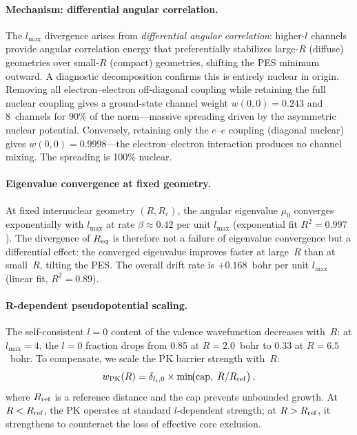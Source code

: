 \documentclass[aps,pra,twocolumn,superscriptaddress,longbibliography,floatfix]{revtex4-2}
\begin{document}
\paragraph{Mechanism: differential angular correlation.}
The $l_{\max}$ divergence arises from \emph{differential angular
correlation}: higher-$l$ channels provide angular correlation energy
that preferentially stabilizes large-$R$ (diffuse) geometries over
small-$R$ (compact) geometries, shifting the PES minimum outward.
A diagnostic decomposition confirms this is entirely nuclear in
origin.  Removing all electron--electron off-diagonal coupling
while retaining the full nuclear coupling gives a ground-state
channel weight $w(0{,}0) = 0.243$ and 8~channels for 90\% of
the norm---massive spreading driven by the asymmetric nuclear
potential.  Conversely, retaining only the $e$--$e$ coupling
(diagonal nuclear) gives $w(0{,}0) = 0.9998$---the electron--electron
interaction produces no channel mixing.  The spreading is 100\%
nuclear.

\paragraph{Eigenvalue convergence at fixed geometry.}
At fixed internuclear geometry $(R, R_e)$, the angular eigenvalue
$\mu_0$ converges exponentially with $l_{\max}$ at rate
$\beta \approx 0.42$ per unit $l_{\max}$ (exponential fit
$R^2 = 0.997$).  The divergence of $R_{\rm eq}$ is therefore not a
failure of eigenvalue convergence but a differential effect: the
converged eigenvalue improves faster at large~$R$ than at
small~$R$, tilting the PES.  The overall drift rate is
$+0.168$~bohr per unit $l_{\max}$ (linear fit, $R^2 = 0.89$).

\paragraph{R-dependent pseudopotential scaling.}
\label{par:rdep_pk}
The self-consistent $l = 0$ content of the valence wavefunction
decreases with~$R$: at $l_{\max} = 4$, the $l = 0$ fraction drops
from 0.85 at $R = 2.0$~bohr to 0.33 at $R = 6.5$~bohr.  To
compensate, we scale the PK barrier strength with~$R$:
\begin{equation}
  w_{\rm PK}(R) = \delta_{l_i, 0} \times
    \min\!\bigl(\text{cap},\; R/R_{\rm ref}\bigr)\,,
  \label{eq:rdep_pk}
\end{equation}
where $R_{\rm ref}$ is a reference distance and the cap prevents
unbounded growth.  At $R < R_{\rm ref}$, the PK operates at
standard $l$-dependent strength; at $R > R_{\rm ref}$, it
strengthens to counteract the loss of effective core exclusion.
\end{document}

